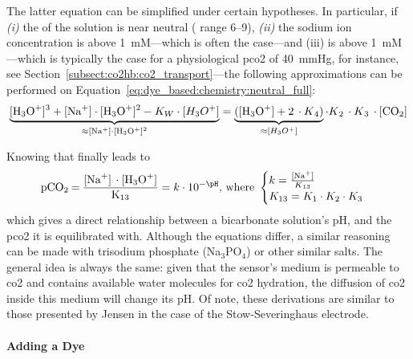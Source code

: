 The latter equation can be simplified under certain hypotheses. In particular, if \textit{(i)} the \pH{} of the solution is near neutral (\pH{} range 6--9), \textit{(ii)} the sodium  ion concentration is above 1~mM---which is often the case\cite{opitz1984, zhujun1984b}---and (iii) \ce{[CO_2]} is above 1~mM---which is typically the case for a physiological \gls{pco2} of 40~mmHg, for instance, see Section~\ref{subsect:co2hb:co2_transport}---the following approximations can be performed on Equation~\ref{eq:dye_based:chemistry:neutral_full}:
\begin{equation}
	\underbrace{\ce{[H_3O^+]^3 + [Na^+]\cdot[H_3O^+]^2}- K_W \cdot [H_3O^+]}_{\approx \ce{[Na^+]\cdot [H_3O^+]^2}} = \underbrace{(\ce{[H_3O^+] + 2 \cdot $K$_4})}_{\approx [H_3O^+]}\cdot \ce{$K$_2 \cdot $K$_3 \cdot [CO_2]}
\end{equation}

Knowing that  finally leads to
\begin{equation}\label{eq:choos:dye_based:chemistry:pco2_pH_link}
	\ce{pCO_2 = \frac{[Na^+] \cdot [H_3O^+]}{K_13}} = k \cdot 10^{-\pH}\text{, where }
	\begin{cases}
		k = \ce{\frac{[Na^+]}{$K$_13}}\\
		K_{13} = K_1 \cdot K_2 \cdot K_3
	\end{cases}
\end{equation}
which gives a direct relationship between a bicarbonate solution's pH, and the \gls{pco2} it is equilibrated with. Although the equations differ, a similar reasoning can be made with trisodium phosphate (Na$_3$PO$_4$) or other similar salts. The general idea is always the same: given that the sensor's medium is permeable to \gls{co2} and contains available water molecules for \gls{co2} hydration, the diffusion of \gls{co2} inside this medium will change its pH. Of note, these derivations are similar to those presented by Jensen \etal{} in the case of the Stow-Severinghaus electrode\cite{jensen1979}.

\paragraph{Adding a Dye}\mbox{}\\

